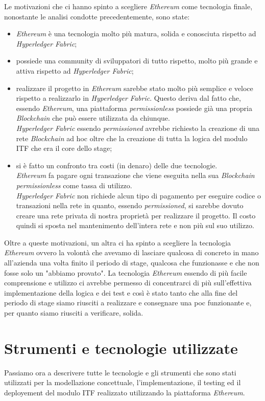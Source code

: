Le motivazioni che ci hanno spinto a scegliere \textit{Ethereum} come tecnologia finale, nonostante le analisi condotte precedentemente, sono state:
\begin{itemize}
	\item \textit{Ethereum} è una tecnologia molto più matura, solida e conosciuta rispetto ad \textit{Hyperledger Fabric};
	\item possiede una community di sviluppatori di tutto rispetto, molto più grande e attiva rispetto ad \textit{Hyperledger Fabric};
	\item realizzare il progetto in \textit{Ethereum} sarebbe stato molto più semplice e veloce rispetto a realizzarlo in \textit{Hyperledger Fabric}. Questo deriva dal fatto che, essendo \textit{Ethereum}, una piattaforma \textit{permissionless} possiede già una propria \textit{Blockchain} che può essere utilizzata da chiunque.\\
	\textit{Hyperledger Fabric} essendo \textit{permissioned} avrebbe richiesto la creazione di una rete \textit{Blockchain} ad hoc oltre che la creazione di tutta la logica del modulo \gls{ITF} che era il core dello stage;
	\item si è fatto un confronto tra costi (in denaro) delle due tecnologie.\\
	\textit{Ethereum} fa pagare ogni transazione che viene eseguita nella sua \textit{Blockchain permissionless} come tassa di utilizzo.\\
	\textit{Hyperledger Fabric} non richiede alcun tipo di pagamento per eseguire codice o transazioni nella rete in quanto, essendo \textit{permissioned}, si sarebbe dovuto creare una rete privata di nostra proprietà per realizzare il progetto. Il costo quindi si sposta nel mantenimento dell'intera rete e non più sul suo utilizzo.
\end{itemize}
Oltre a queste motivazioni, un altra ci ha spinto a scegliere la tecnologia \textit{Ethereum} ovvero la volontà che avevamo di lasciare qualcosa di concreto in mano all'azienda una volta finito il periodo di stage, qualcosa che funzionasse e che non fosse solo un "abbiamo provato". La tecnologia \textit{Ethereum} essendo di più facile comprensione e utilizzo ci avrebbe permesso di concentrarci di più sull'effettiva implementazione della logica e dei test e così è stato tanto che alla fine del periodo di stage siamo riusciti a realizzare e consegnare una \gls{poc} funzionante e, per quanto siamo riusciti a verificare, solida.

\section{Strumenti e tecnologie utilizzate}
Passiamo ora a descrivere tutte le tecnologie e gli strumenti che sono stati utilizzati per la modellazione concettuale, l'implementazione, il testing ed il deployement del modulo \gls{ITF} realizzato utilizzando la piattaforma \textit{Ethereum}.

